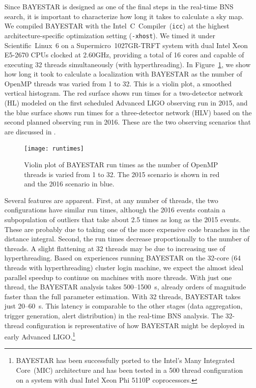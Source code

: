 \documentclass[amsmath,amssymb,aps,prx,reprint,nopreprintnumbers,nofootinbib]{revtex4-1}
\begin{document}
Since \ac{BAYESTAR} is designed as one of the final steps in the real\nobreakdashes-time \ac{BNS} search, it is important to characterize how long it takes to calculate a sky map. We compiled \ac{BAYESTAR} with the Intel~C~Compiler~(\texttt{icc}) at the highest architecture\nobreakdashes-specific optimization setting (\texttt{-xhost}). We timed it under Scientific~Linux~6 on a Supermicro~1027GR\nobreakdashes-TRFT system with dual Intel Xeon E5-2670 CPUs clocked at 2.60GHz, providing a total of 16 cores and capable of executing 32 threads simultaneously (with hyperthreading). In Figure~\ref{fig:runtimes}, we show how long it took to calculate a localization with \ac{BAYESTAR} as the number of OpenMP threads was varied from 1 to 32. This is a violin plot, a smoothed vertical histogram. The red surface shows run times for a two\nobreakdashes-detector network (HL) modeled on the first scheduled Advanced \ac{LIGO} observing run in 2015, and the blue surface shows run times for a three\nobreakdashes-detector network (HLV) based on the second planned observing run in 2016. These are the two observing scenarios that are discussed in \cite{FirstTwoYears}.

\begin{figure}
    \centering
    \texttt{[image: runtimes]}
    \caption[\acs{BAYESTAR} run time]{\label{fig:runtimes}Violin plot of \ac{BAYESTAR} run times as the number of OpenMP threads is varied from 1 to 32. The 2015 scenario is shown in red and the 2016 scenario in blue.}
\end{figure}

Several features are apparent. First, at any number of threads, the two configurations have similar run times, although the 2016 events contain a subpopulation of outliers that take about 2.5 times as long as the 2015 events. These are probably due to taking one of the more expensive code branches in the distance integral. Second, the run times decrease proportionally to the number of threads. A slight flattening at 32 threads may be due to increasing use of hyperthreading. Based on experiences running \ac{BAYESTAR} on the 32\nobreakdashes-core (64 threads with hyperthreading) cluster login machine, we expect the almost ideal parallel speedup to continue on machines with more threads. With just one thread, the \ac{BAYESTAR} analysis takes 500\nobreakdashes--1500~s, already orders of magnitude faster than the full parameter estimation. With 32 threads, \ac{BAYESTAR} takes just 20\nobreakdashes--60~s. This latency is comparable to the other stages (data aggregation, trigger generation, alert distribution) in the real\nobreakdashes-time \ac{BNS} analysis. The 32\nobreakdashes-thread configuration is representative of how \ac{BAYESTAR} might be deployed in early Advanced \ac{LIGO}.\footnote{\ac{BAYESTAR} has been successfully ported to the Intel's Many Integrated Core~(MIC) architecture and has been tested in a 500 thread configuration on a system with dual Intel Xeon Phi 5110P coprocessors.}
\end{document}
